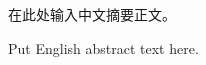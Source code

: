 \begin{cabstract}

在此处输入中文摘要正文。

\end{cabstract}

\begin{eabstract}

Put English abstract text here.

\end{eabstract}